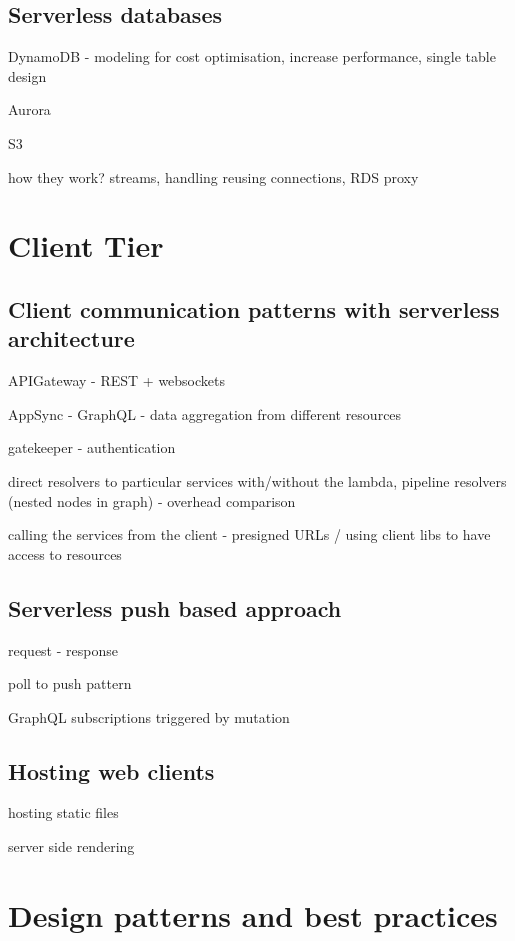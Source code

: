 \subsection{Serverless databases}

DynamoDB - modeling for cost optimisation, increase performance, single table design

Aurora

S3

how they work? streams, handling reusing connections, RDS proxy

\section{Client Tier}

\subsection{Client communication patterns with serverless architecture}

APIGateway - REST + websockets

AppSync - GraphQL - data aggregation from different resources

gatekeeper - authentication

direct resolvers to particular services with/without the lambda, pipeline resolvers (nested nodes in graph) - overhead comparison

calling the services from the client - presigned URLs / using client libs to have access to resources

\subsection{Serverless push based approach}

request - response

poll to push pattern

GraphQL subscriptions triggered by mutation

\subsection{Hosting web clients}

hosting static files

server side rendering

\section{Design patterns and best practices}
